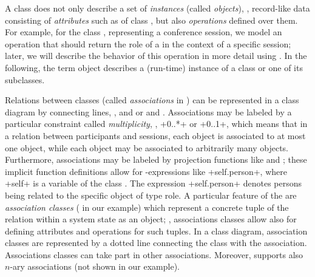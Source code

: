 A class does not only describe a set of \emph{instances} (called
\emph{objects}), \ie, record-like data consisting of \emph{attributes}
such as  of class , but also
\emph{operations} defined over them. For example, for the class
, representing a conference session, we model an
operation  that should return the
role of a  in the context of a specific session;
later, we will describe the behavior of this operation in more detail
using \UML\@. In the following, the term object describes a
(run-time) instance of a class or one of its subclasses.

Relations between classes (called \emph{associations} in \UML)
can be represented in a class diagram by connecting lines, \eg,
 and  or 
and . Associations may be labeled by a particular
constraint called \emph{multiplicity}, \eg, \inlineocl+0..*+ or
\inlineocl+0..1+, which means that in a relation between participants
and sessions, each  object is associated to at
most one  object, while each 
object may be associated to arbitrarily many 
objects. Furthermore, associations may be labeled by projection
functions like  and ; these implicit
function definitions allow for \OCL-expressions like
\inlineocl+self.person+, where \inlineocl+self+ is a variable of the
class . The expression \inlineocl+self.person+ denotes
persons being related to the specific object  of
type role. A particular feature of the \UML are \emph{association
  classes} ( in our example) which represent a
concrete tuple of the relation within a system state as an object;
\ie, associations classes allow also for defining attributes and
operations for such tuples. In a class diagram, association classes
are represented by a dotted line connecting the class with the
association. Associations classes can take part in other associations.
Moreover, \UML supports also $n$-ary associations (not shown in
our example).

